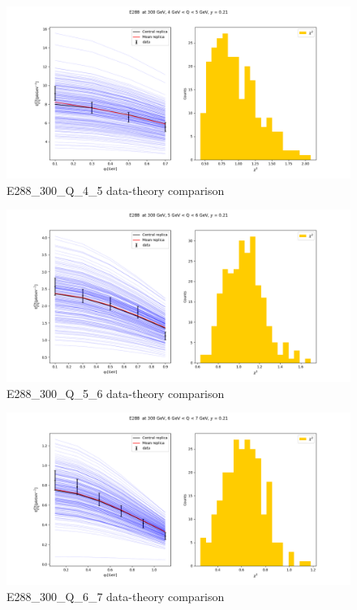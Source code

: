 \documentclass[
]{article}
\begin{document}
\begin{figure}
\centering
\includegraphics{pngplots/E288_300_Q_4_5.png}
\caption{E288\_300\_Q\_4\_5 data-theory comparison}
\end{figure}

\begin{figure}
\centering
\includegraphics{pngplots/E288_300_Q_5_6.png}
\caption{E288\_300\_Q\_5\_6 data-theory comparison}
\end{figure}

\begin{figure}
\centering
\includegraphics{pngplots/E288_300_Q_6_7.png}
\caption{E288\_300\_Q\_6\_7 data-theory comparison}
\end{figure}
\end{document}
